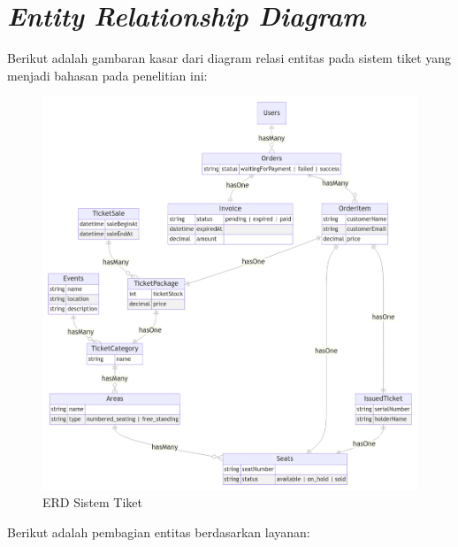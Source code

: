 \section{\textit{Entity Relationship Diagram}}

Berikut adalah gambaran kasar dari diagram relasi entitas pada sistem tiket yang menjadi bahasan pada penelitian ini:

\begin{figure}[htbp]
    \centering
    \includegraphics[width=1\textwidth]{resources/appendix/erd.png}
    \caption{ERD Sistem Tiket}
    \label{fig:ticket-system-erd-proposal}
\end{figure}

Berikut adalah pembagian entitas berdasarkan layanan:

